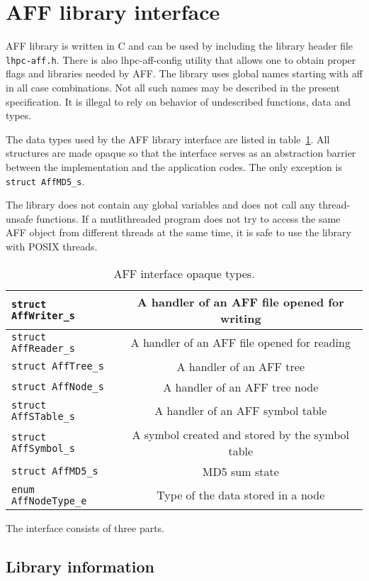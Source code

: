 \documentclass[10pt,letterpaper]{article}
\newcommand{\ctext}[1]{\texttt{#1}}         %
\newcommand{\libname}[1]{\ctext{#1}\index{\ctext{#1}}} %
\newcommand{\ctype}[1]{\ctext{#1}}          %
\newcommand{\libtype}[1]{\libname{#1}}      %
\begin{document}
\section{AFF library interface}
AFF library is written in C and can be used by including the library header file \verb|lhpc-aff.h|.
There is also lhpc-aff-config utility that allows one to obtain proper flags 
and libraries needed by AFF.
The library uses global names starting with aff in all case combinations. 
Not all such names may be described in the present specification.
It is illegal to rely on behavior of undescribed functions, data and types.

The data types used by the AFF library interface are listed in
table~\ref{tab:opaque_types}. All structures are made opaque so that
the interface serves as an abstraction barrier between the
implementation and the application codes. The only exception is
\ctype{struct AffMD5\_s}.

The library does not contain any global variables and does not call any thread-unsafe functions. If a
mutlithreaded program does not try to access the same AFF object from different threads at the same
time, it is safe to use the library with POSIX threads.

\begin{table}
\caption{AFF interface opaque types.}
\label{tab:opaque_types}
\begin{tabular}{|l|c|} \hline
\libtype{struct AffWriter\_s} & A handler of an AFF file opened for writing \\ \hline
\libtype{struct AffReader\_s} & A handler of an AFF file opened for reading \\ \hline
\libtype{struct AffTree\_s} & A handler of an AFF tree \\ \hline
\libtype{struct AffNode\_s} & A handler of an AFF tree node \\ \hline
\libtype{struct AffSTable\_s} & A handler of an AFF symbol table \\ \hline
\libtype{struct AffSymbol\_s} & A symbol created and stored by the symbol table \\ \hline
\libtype{struct AffMD5\_s} & MD5 sum state \\ \hline
\libtype{enum AffNodeType\_e} & Type of the data stored in a node \\ \hline
\end{tabular}
\end{table}

The interface consists of three parts.
\subsection{Library information}
\end{document}
